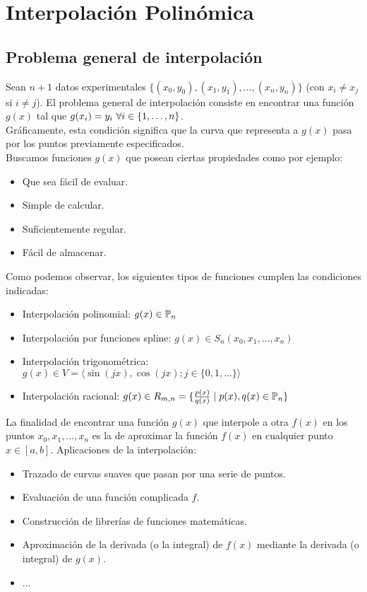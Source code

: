 \chapter{Interpolación Polinómica}
\section*{Problema general de interpolación}
\noindent
Sean $n+1$ datos experimentales $\{(x_0, y_0), (x_1, y_1), \ldots, (x_n,y_n)\}$ (con $x_i\neq x_j$ si $i\neq j$).\newline
El problema general de interpolación consiste en encontrar una función $g(x)$ tal que $g(x_i)=y_i \ \forall i \in \{1, \ldots, n\}$.\\

\noindent
Gráficamente, esta condición significa que la curva que representa a $g(x)$ pasa por los puntos previamente especificados.\\

\noindent
Buscamos funciones $g(x)$ que posean ciertas propiedades como por ejemplo:
\begin{itemize}
    \item Que sea fácil de evaluar.
    \item Simple de calcular.
    \item Suficientemente regular.
    \item Fácil de almacenar.
\end{itemize}

\noindent
Como podemos observar, los siguientes tipos de funciones cumplen las condiciones indicadas:
\begin{itemize}
    \item Interpolación polinomial: $g(x) \in \mathbb{P}_n$
    \item Interpolación por funciones spline: $g(x)\in S_n(x_0, x_1, \ldots, x_n)$
    \item Interpolación trigonométrica: $g(x)\in V=\langle \sin(jx), \cos(jx); j\in\{0,1,\ldots\}\rangle$
    \item Interpolación racional: $g(x)\in R_{m,n}=\{\frac{p(x)}{q(x)} \mid p(x),q(x) \in \mathbb{P}_n\}$
\end{itemize}

\noindent
La finalidad de encontrar una función $g(x)$ que interpole a otra $f(x)$ en los puntos $x_0, x_1, \ldots, x_n$ es la
de aproximar la función $f(x)$ en cualquier punto $x \in [a,b]$. Aplicaciones de la interpolación:
\begin{itemize}
    \item Trazado de curvas suaves que pasan por una serie de puntos.
    \item Evaluación de una función complicada $f$.
    \item Construcción de librerías de funciones matemáticas.
    \item Aproximación de la derivada (o la integral) de $f(x)$ mediante la derivada (o integral) de $g(x)$.
    \item $\ldots$
\end{itemize}


